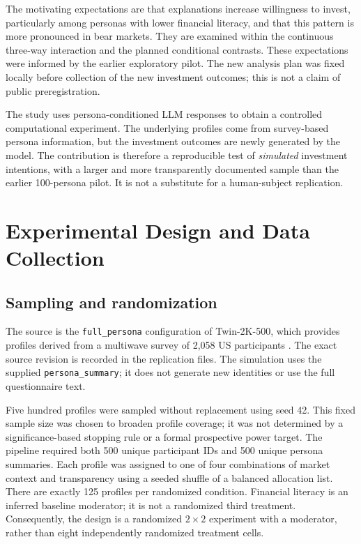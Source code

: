 \documentclass[11pt,a4paper]{article}
\begin{document}
The motivating expectations are that explanations increase willingness to invest, particularly among personas with lower financial literacy, and that this pattern is more pronounced in bear markets. They are examined within the continuous three-way interaction and the planned conditional contrasts. These expectations were informed by the earlier exploratory pilot. The new analysis plan was fixed locally before collection of the new investment outcomes; this is not a claim of public preregistration.

The study uses persona-conditioned LLM responses to obtain a controlled computational experiment. The underlying profiles come from survey-based persona information, but the investment outcomes are newly generated by the model. The contribution is therefore a reproducible test of \textit{simulated} investment intentions, with a larger and more transparently documented sample than the earlier 100-persona pilot. It is not a substitute for a human-subject replication.

\section{Experimental Design and Data Collection}
\subsection{Sampling and randomization}
The source is the \texttt{full\_persona} configuration of Twin-2K-500, which provides profiles derived from a multiwave survey of 2,058 US participants \citep{twin2025}. The exact source revision is recorded in the replication files. The simulation uses the supplied \texttt{persona\_summary}; it does not generate new identities or use the full questionnaire text.

Five hundred profiles were sampled without replacement using seed 42. This fixed sample size was chosen to broaden profile coverage; it was not determined by a significance-based stopping rule or a formal prospective power target. The pipeline required both 500 unique participant IDs and 500 unique persona summaries. Each profile was assigned to one of four combinations of market context and transparency using a seeded shuffle of a balanced allocation list. There are exactly 125 profiles per randomized condition. Financial literacy is an inferred baseline moderator; it is not a randomized third treatment. Consequently, the design is a randomized $2\times2$ experiment with a moderator, rather than eight independently randomized treatment cells.
\end{document}
